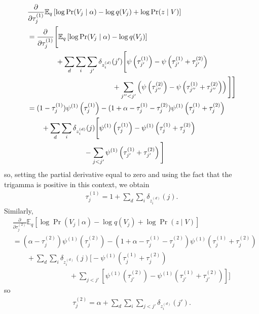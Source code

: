 \documentclass{article}
\newcommand{\digamma}[1]{\ensuremath{\psi\left(#1\right)}}
\newcommand{\trigamma}[1]{\ensuremath{\psi^{(1)}\left(#1\right)}}
\newcommand{\Elogdirichlet}[2]{\ensuremath{\digamma{#1} - \digamma{#2}}}
\newcommand{\Elogbeta}[3]{\Elogdirichlet{\ifnum#3=1\relax#1\else#2\fi}{#1 + #2}}
\newcommand{\Eq}{\ensuremath{\mathbb{E}_q\xspace}}
\newcommand{\leftsibling}{\ensuremath{<}}
\newcommand{\pd}[1]{\ensuremath{\frac{\partial}{\partial #1}}}
\begin{document}
\begin{align*}
    &\pd{\tau_{j}^{(1)}} \Eq \left[ \log \Pr(V_j \mid \alpha) - \log q(V_j) + \log \Pr(z \mid V) \right] \\
    &= \pd{\tau_{j}^{(1)}} \Bigg[ \Eq \left[ \log \Pr(V_j \mid \alpha) - \log q(V_j) \right] \\
        &\qquad\qquad + \sum_d \sum_i \sum_{j'} \delta_{z_i^{(d)}}({j'}) \Bigg[ \Elogbeta{\tau_{j'}^{(1)}}{\tau_{j'}^{(2)}}{1} \\
        &\qquad\qquad\qquad\qquad\qquad\qquad + \sum_{j'' < j'}\left( \Elogbeta{\tau_{j''}^{(1)}}{\tau_{j''}^{(2)}}{2} \right)\Bigg] \Bigg] \\
    &= (1 - \tau^{(1)}_j) \trigamma{\tau^{(1)}_j} - (1 + \alpha - \tau^{(1)}_j - \tau^{(2)}_j) \trigamma{\tau^{(1)}_j + \tau^{(2)}_j} \\
        &\qquad + \sum_d \sum_i \delta_{z_i^{(d)}}({j}) \Bigg[ \trigamma{\tau_{j}^{(1)}} - \trigamma{\tau_{j}^{(1)} + \tau_{j}^{(2)}} \\
        &\qquad\qquad\qquad\qquad - \sum_{j \leftsibling j'} \trigamma{\tau_{j'}^{(1)} + \tau_{j'}^{(2)}} \Bigg]
\end{align*}
so, setting the partial derivative equal to zero and using the fact that the trigamma is positive in this context, we obtain
\begin{align*}
    \boxed{ \tau^{(1)}_j = 1 + \sum_d \sum_i \delta_{z_i^{(d)}}({j}) }.
\end{align*}
Similarly,
\begin{align*}
    &\pd{\tau_{j}^{(2)}} \Eq \left[ \log \Pr(V_j \mid \alpha) - \log q(V_j) + \log \Pr(z \mid V) \right] \\
    &= (\alpha - \tau^{(2)}_j) \trigamma{\tau^{(2)}_j} - (1 + \alpha - \tau^{(1)}_j - \tau^{(2)}_j) \trigamma{\tau^{(1)}_j + \tau^{(2)}_j} \\
        &\qquad + \sum_d \sum_i \delta_{z_i^{(d)}}({j}) \Bigg[ - \trigamma{\tau_{j}^{(1)} + \tau_{j}^{(2)}} \\
        &\qquad\qquad\qquad\qquad + \sum_{j \leftsibling j'} \left[ \trigamma{\tau_{j'}^{(2)}} - \trigamma{\tau_{j'}^{(1)} + \tau_{j'}^{(2)}} \right] \Bigg]
\end{align*}
so
\begin{align*}
    \boxed{ \tau^{(2)}_j = \alpha + \sum_d \sum_i \sum_{j \leftsibling j'} \delta_{z_i^{(d)}}({j'}) }.
\end{align*}
\end{document}
